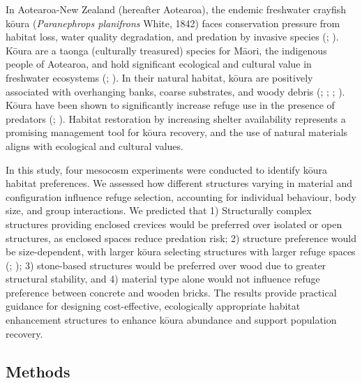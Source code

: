 \documentclass[
  letterpaper,
  DIV=11,
  numbers=noendperiod]{scrartcl}
\begin{document}
In Aotearoa-New Zealand (hereafter Aotearoa), the endemic freshwater
crayfish kōura (\emph{Paranephrops planifrons} White, 1842) faces
conservation pressure from habitat loss, water quality degradation, and
predation by invasive species (; ). Kōura are
a taonga (culturally treasured) species for Māori, the indigenous people
of Aotearoa, and hold significant ecological and cultural value in
freshwater ecosystems (; ). In their
natural habitat, kōura are positively associated with overhanging banks,
coarse substrates, and woody debris (; ;
;
). Kōura have been
shown to significantly increase refuge use in the presence of predators
(;
). Habitat
restoration by increasing shelter availability represents a promising
management tool for kōura recovery, and the use of natural materials
aligns with ecological and cultural values.

In this study, four mesocosm experiments were conducted to identify
kōura habitat preferences. We assessed how different structures varying
in material and configuration influence refuge selection, accounting for
individual behaviour, body size, and group interactions. We predicted
that 1) Structurally complex structures providing enclosed crevices
would be preferred over isolated or open structures, as enclosed spaces
reduce predation risk; 2) structure preference would be size-dependent,
with larger kōura selecting structures with larger refuge spaces
(;
); 3) stone-based
structures would be preferred over wood due to greater structural
stability, and 4) material type alone would not influence refuge
preference between concrete and wooden bricks. The results provide
practical guidance for designing cost-effective, ecologically
appropriate habitat enhancement structures to enhance kōura abundance
and support population recovery.

\subsection{Methods}\label{methods}
\end{document}
